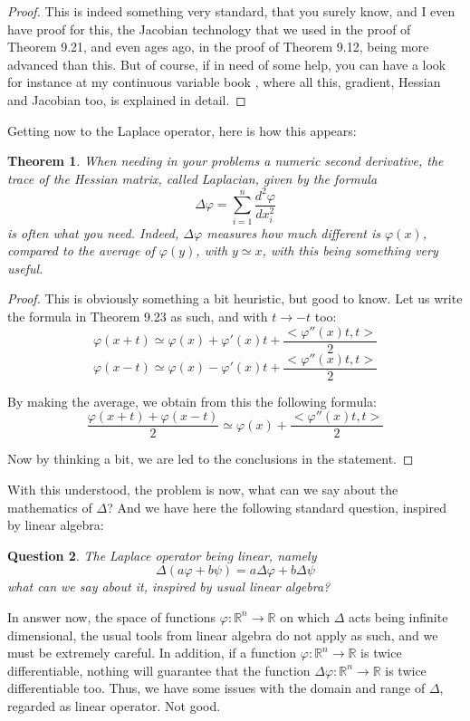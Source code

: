 \documentclass[12pt]{amsbook}
\newtheorem{theorem}{Theorem}[chapter]
\newtheorem{question}[theorem]{Question}
\begin{document}
\begin{proof}
This is indeed something very standard, that you surely know, and I even have proof for this, the Jacobian technology that we used in the proof of Theorem 9.21, and even ages ago, in the proof of Theorem 9.12, being more advanced than this. But of course, if in need of some help, you can have a look for instance at my continuous variable book \cite{ba2}, where all this, gradient, Hessian and Jacobian too, is explained in detail.
\end{proof}

Getting now to the Laplace operator, here is how this appears:


\begin{theorem}
When needing in your problems a numeric second derivative, the trace of the Hessian matrix, called Laplacian, given by the formula
$$\Delta\varphi=\sum_{i=1}^n\frac{d^2\varphi}{dx_i^2}$$
is often what you need. Indeed, $\Delta\varphi$ measures how much different is $\varphi(x)$, compared to the average of $\varphi(y)$, with $y\simeq x$, with this being something very useful.
\end{theorem}

\begin{proof}
This is obviously something a bit heuristic, but good to know. Let us write the formula in Theorem 9.23 as such, and with $t\to-t$ too:
$$\varphi(x+t)\simeq\varphi(x)+\varphi'(x)t+\frac{<\varphi''(x)t,t>}{2}$$
$$\varphi(x-t)\simeq\varphi(x)-\varphi'(x)t+\frac{<\varphi''(x)t,t>}{2}$$

By making the average, we obtain from this the following formula:
$$\frac{\varphi(x+t)+\varphi(x-t)}{2}\simeq\varphi(x)+\frac{<\varphi''(x)t,t>}{2}$$

Now by thinking a bit, we are led to the conclusions in the statement.
\end{proof} 

With this understood, the problem is now, what can we say about the mathematics of $\Delta$? And we have here the following standard question, inspired by linear algebra: 

\begin{question}
The Laplace operator being linear, namely
$$\Delta(a\varphi+b\psi)=a\Delta\varphi+b\Delta\psi$$
what can we say about it, inspired by usual linear algebra?
\end{question}

In answer now, the space of functions $\varphi:\mathbb R^n\to\mathbb R$ on which $\Delta$ acts being infinite dimensional, the usual tools from linear algebra do not apply as such, and we must be extremely careful. In addition, if a function $\varphi:\mathbb R^n\to\mathbb R$ is twice differentiable, nothing will guarantee that the function $\Delta\varphi:\mathbb R^n\to\mathbb R$ is twice differentiable too. Thus, we have some issues with the domain and range of $\Delta$, regarded as linear operator. Not good.
\end{document}
